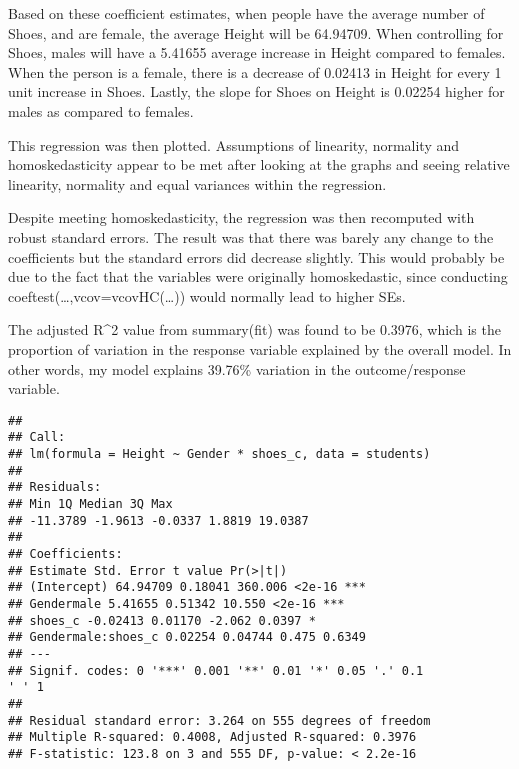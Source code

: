 \documentclass[]{article}
\newenvironment{Shaded}{\begin{snugshade}}{\end{snugshade}}
\newcommand{\DataTypeTok}[1]{\textcolor[rgb]{0.13,0.29,0.53}{#1}}
\newcommand{\KeywordTok}[1]{\textcolor[rgb]{0.13,0.29,0.53}{\textbf{#1}}}
\newcommand{\NormalTok}[1]{#1}
\newcommand{\OperatorTok}[1]{\textcolor[rgb]{0.81,0.36,0.00}{\textbf{#1}}}
\newcommand{\StringTok}[1]{\textcolor[rgb]{0.31,0.60,0.02}{#1}}
\begin{document}
Based on these coefficient estimates, when people have the average
number of Shoes, and are female, the average Height will be 64.94709.
When controlling for Shoes, males will have a 5.41655 average increase
in Height compared to females. When the person is a female, there is a
decrease of 0.02413 in Height for every 1 unit increase in Shoes.
Lastly, the slope for Shoes on Height is 0.02254 higher for males as
compared to females.

This regression was then plotted. Assumptions of linearity, normality
and homoskedasticity appear to be met after looking at the graphs and
seeing relative linearity, normality and equal variances within the
regression.

Despite meeting homoskedasticity, the regression was then recomputed
with robust standard errors. The result was that there was barely any
change to the coefficients but the standard errors did decrease
slightly. This would probably be due to the fact that the variables were
originally homoskedastic, since conducting
coeftest(\ldots{},vcov=vcovHC(\ldots{})) would normally lead to higher
SEs.

The adjusted R\^{}2 value from summary(fit) was found to be 0.3976,
which is the proportion of variation in the response variable explained
by the overall model. In other words, my model explains 39.76\%
variation in the outcome/response variable.

\begin{Shaded}
\end{Shaded}

\begin{verbatim}
##
## Call:
## lm(formula = Height ~ Gender * shoes_c, data = students)
##
## Residuals:
## Min 1Q Median 3Q Max
## -11.3789 -1.9613 -0.0337 1.8819 19.0387
##
## Coefficients:
## Estimate Std. Error t value Pr(>|t|)
## (Intercept) 64.94709 0.18041 360.006 <2e-16 ***
## Gendermale 5.41655 0.51342 10.550 <2e-16 ***
## shoes_c -0.02413 0.01170 -2.062 0.0397 *
## Gendermale:shoes_c 0.02254 0.04744 0.475 0.6349
## ---
## Signif. codes: 0 '***' 0.001 '**' 0.01 '*' 0.05 '.' 0.1
' ' 1
##
## Residual standard error: 3.264 on 555 degrees of freedom
## Multiple R-squared: 0.4008, Adjusted R-squared: 0.3976
## F-statistic: 123.8 on 3 and 555 DF, p-value: < 2.2e-16
\end{verbatim}
\end{document}
